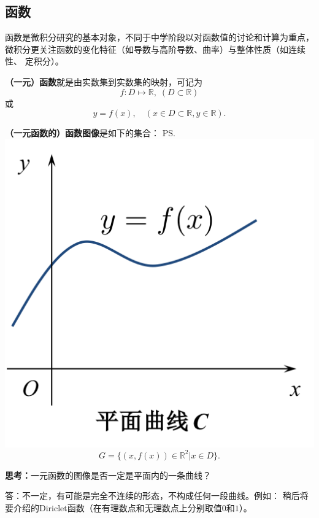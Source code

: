 \subsection{函数}
	
函数是微积分研究的基本对象，不同于中学阶段以对函数值的讨论和计算为重点，
微积分更关注函数的变化特征（如导数与高阶导数、曲率）与整体性质（如连续性、
定积分）。

{\bf （一元）函数}就是由实数集到实数集的映射，可记为
$$f:D\mapsto\mathbb{R},\;(D\subset\mathbb{R})$$
或
$$y=f(x),\quad (x\in D\subset\mathbb{R},y\in\mathbb{R}).$$

{\bf （一元函数的）函数图像}是如下的集合：
\ps{\includegraphics[width=\marginparwidth]{./images/Ch01/yfx.png}}
$$G=\{(x,f(x))\in\mathbb{R}^2|x\in D\}.$$

{\bf 思考：}一元函数的图像是否一定是平面内的一条曲线？

\ifhint
答：不一定，有可能是完全不连续的形态，不构成任何一段曲线。例如：
稍后将要介绍的Diriclet函数（在有理数点和无理数点上分别取值$0$和$1$）。
\fi


